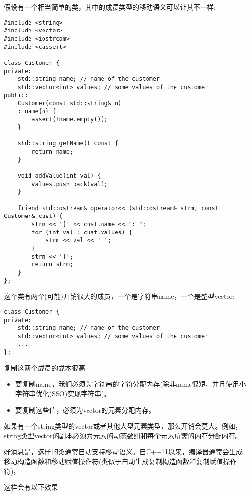 假设有一个相当简单的类，其中的成员类型的移动语义可以让其不一样:\par

{\color{red}{basics/customer.hpp}}

\begin{lstlisting}[caption={}]
#include <string>
#include <vector>
#include <iostream>
#include <cassert>

class Customer {
private:
	std::string name; // name of the customer
	std::vector<int> values; // some values of the customer
public:
	Customer(const std::string& n)
	: name{n} {
		assert(!name.empty());
	}

	std::string getName() const {
		return name;
	}

	void addValue(int val) {
		values.push_back(val);
	}

	friend std::ostream& operator<< (std::ostream& strm, const Customer& cust) {
		strm << '[' << cust.name << ": ";
		for (int val : cust.values) {
			strm << val << ' ';
		}
		strm << ']';
		return strm;
	}
};
\end{lstlisting}

这个类有两个(可能)开销很大的成员，一个是字符串name，一个是整型vector:\par

\begin{lstlisting}[caption={}]
class Customer {
private:
	std::string name; // name of the customer
	std::vector<int> values; // some values of the customer
	...
};
\end{lstlisting}

复制这两个成员的成本很高\par

\begin{itemize}
	\item 要复制name，我们必须为字符串的字符分配内存(除非name很短，并且使用小字符串优化(SSO)实现字符串)。
	\item 要复制这些值，必须为vector的元素分配内存。
\end{itemize}

如果有一个string类型的vector或者其他大型元素类型，那么开销会更大。例如，string类型vector的副本必须为元素的动态数组和每个元素所需的内存分配内存。\par

好消息是，这样的类通常自动支持移动语义。自C++11以来，编译器通常会生成移动构造函数和移动赋值操作符(类似于自动生成复制构造函数和复制赋值操作符)。\par

这样会有以下效果:\par

